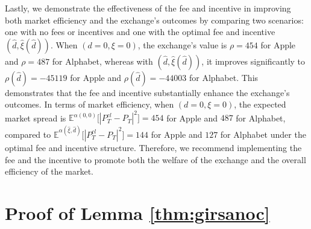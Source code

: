 \documentclass[12pt]{article}
\begin{document}
Lastly, we demonstrate the effectiveness of the fee and incentive in improving both market efficiency and the exchange's outcomes by comparing two scenarios: one with no fees or incentives and one with the optimal fee and incentive $(\hat{d}, \hat{\xi}(\hat{d}))$. When $(d = 0, \xi = 0)$, the exchange's value is $\rho = 454$ for Apple and $\rho = 487$ for Alphabet, whereas with $(\hat{d}, \hat{\xi}(\hat{d}))$, it improves significantly to $\rho(\hat{d}) = -45119$ for Apple and $\rho(\hat{d}) = -44003$ for Alphabet. This demonstrates that the fee and incentive substantially enhance the exchange’s outcomes. In terms of market efficiency, when $(d = 0, \xi = 0)$, the expected market spread is $\mathbb{E}^{\alpha(0,0)}\Big[|P^{cl}_T - P_T^{}|^2\Big] = 454$ for Apple and $487$ for Alphabet, compared to $\mathbb{E}^{\alpha(\hat{\xi}, \hat{d})}\Big[|P^{cl}_T - P_T^{}|^2\Big] = 144$ for Apple and $127$ for Alphabet under the optimal fee and incentive structure. Therefore, we recommend implementing the fee and the incentive to promote both the welfare of the exchange and the overall efficiency of the market.





%
%



  \newpage 
  \small
  


\appendix

\section{Proof of Lemma \ref{thm:girsanoc}}\label{app:girsanov}
\end{document}

